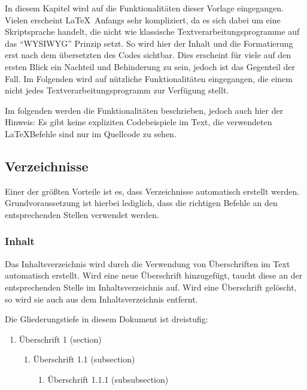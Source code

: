 In diesem Kapitel wird auf die Funktionalitäten dieser Vorlage eingegangen. Vielen erscheint \LaTeX\ Anfangs sehr kompliziert, da es sich dabei um eine Skriptsprache handelt, die nicht wie klassische Textverarbeitungsprogramme auf das \enquote{\ac{WYSIWYG}} Prinzip setzt. So wird hier der Inhalt und die Formatierung erst nach dem übersetzten des Codes sichtbar. Dies erscheint für viele auf den ersten Blick ein Nachteil und Behinderung zu sein, jedoch ist das Gegenteil der Fall. Im Folgenden wird auf nützliche Funktionalitäten eingegangen, die einem nicht jedes Textverarbeitungsprogramm zur Verfügung stellt.

Im folgenden werden die Funktionalitäten beschrieben, jedoch auch hier der Hinweis: Es gibt keine expliziten Codebeispiele im Text, die verwendeten \LaTeX\-Befehle sind nur im Quellcode zu sehen.

\subsection{Verzeichnisse}

Einer der größten Vorteile ist es, dass Verzeichnisse automatisch erstellt werden. Grundvoraussetzung ist hierbei lediglich, dass die richtigen Befehle an den entsprechenden Stellen verwendet werden.

\subsubsection{Inhalt}

Das Inhaltsverzeichnis wird durch die Verwendung von Überschriften im Text automatisch erstellt. Wird eine neue Überschrift hinzugefügt, taucht diese an der entsprechenden Stelle im Inhaltsverzeichnis auf. Wird eine Überschrift gelöscht, so wird sie auch aus dem Inhaltsverzeichnis entfernt.

Die Gliederungstiefe in diesem Dokument ist dreistufig:

\begin{enumerate}
	\item Überschrift 1 (section)
	\begin{enumerate}
		\item Überschrift 1.1 (subsection)
		\begin{enumerate}
			\item Überschrift 1.1.1 (subsubsection)
		\end{enumerate}
	\end{enumerate}
\end{enumerate}

